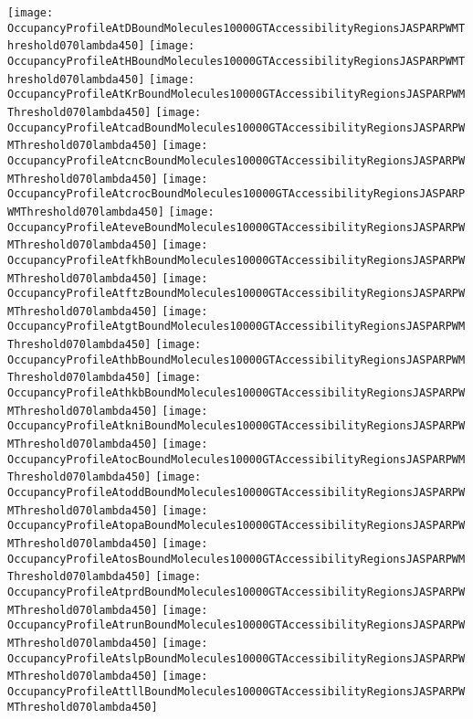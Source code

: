 \documentclass[11pt]{article}
\begin{document}
 


\begin{center}
\texttt{[image: OccupancyProfileAtDBoundMolecules10000GTAccessibilityRegionsJASPARPWMThreshold070lambda450]}
\texttt{[image: OccupancyProfileAtHBoundMolecules10000GTAccessibilityRegionsJASPARPWMThreshold070lambda450]}
\texttt{[image: OccupancyProfileAtKrBoundMolecules10000GTAccessibilityRegionsJASPARPWMThreshold070lambda450]}
\texttt{[image: OccupancyProfileAtcadBoundMolecules10000GTAccessibilityRegionsJASPARPWMThreshold070lambda450]}
\texttt{[image: OccupancyProfileAtcncBoundMolecules10000GTAccessibilityRegionsJASPARPWMThreshold070lambda450]}
\texttt{[image: OccupancyProfileAtcrocBoundMolecules10000GTAccessibilityRegionsJASPARPWMThreshold070lambda450]}
\texttt{[image: OccupancyProfileAteveBoundMolecules10000GTAccessibilityRegionsJASPARPWMThreshold070lambda450]}
\texttt{[image: OccupancyProfileAtfkhBoundMolecules10000GTAccessibilityRegionsJASPARPWMThreshold070lambda450]}
\texttt{[image: OccupancyProfileAtftzBoundMolecules10000GTAccessibilityRegionsJASPARPWMThreshold070lambda450]}
\texttt{[image: OccupancyProfileAtgtBoundMolecules10000GTAccessibilityRegionsJASPARPWMThreshold070lambda450]}
\texttt{[image: OccupancyProfileAthbBoundMolecules10000GTAccessibilityRegionsJASPARPWMThreshold070lambda450]}
\texttt{[image: OccupancyProfileAthkbBoundMolecules10000GTAccessibilityRegionsJASPARPWMThreshold070lambda450]}
\texttt{[image: OccupancyProfileAtkniBoundMolecules10000GTAccessibilityRegionsJASPARPWMThreshold070lambda450]}
\texttt{[image: OccupancyProfileAtocBoundMolecules10000GTAccessibilityRegionsJASPARPWMThreshold070lambda450]}
\texttt{[image: OccupancyProfileAtoddBoundMolecules10000GTAccessibilityRegionsJASPARPWMThreshold070lambda450]}
\texttt{[image: OccupancyProfileAtopaBoundMolecules10000GTAccessibilityRegionsJASPARPWMThreshold070lambda450]}
\texttt{[image: OccupancyProfileAtosBoundMolecules10000GTAccessibilityRegionsJASPARPWMThreshold070lambda450]}
\texttt{[image: OccupancyProfileAtprdBoundMolecules10000GTAccessibilityRegionsJASPARPWMThreshold070lambda450]}
\texttt{[image: OccupancyProfileAtrunBoundMolecules10000GTAccessibilityRegionsJASPARPWMThreshold070lambda450]}
\texttt{[image: OccupancyProfileAtslpBoundMolecules10000GTAccessibilityRegionsJASPARPWMThreshold070lambda450]}
\texttt{[image: OccupancyProfileAttllBoundMolecules10000GTAccessibilityRegionsJASPARPWMThreshold070lambda450]}
\end{center}


\end{document}
